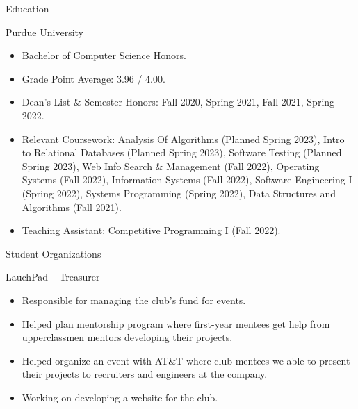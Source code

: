 \documentclass{article}
\newlength{\tabin}
\newlength{\secsep}
\newcommand{\lineunder}{\vspace*{-8pt} \\ \hspace*{-6pt} \hrulefill \\ \vspace*{-15pt}}
\newenvironment{tabbedsection}[1]{
  \begin{list}{}{
      \setlength{\itemsep}{0pt}
      \setlength{\labelsep}{0pt}
      \setlength{\labelwidth}{0pt}
      \setlength{\leftmargin}{\tabin}
      \setlength{\rightmargin}{\tabin}
      \setlength{\listparindent}{0pt}
      \setlength{\parsep}{0pt}
      \setlength{\parskip}{0pt}
      \setlength{\partopsep}{0pt}
      \setlength{\topsep}{#1}
    }
  \item[]
}{\end{list}}
\newenvironment{resume_section}[1]{
  \filbreak
  \vspace{2\secsep}
  \textsc{\large#1}
  \lineunder
  \begin{tabbedsection}{\secsep}
}{\end{tabbedsection}}
\newenvironment{resume_subsection}[2][]{
  \textbf{#2} \hfill {\footnotesize #1} \hspace{2em}
  \begin{tabbedsection}{0.5\secsep}
}{\end{tabbedsection}}
\newenvironment{subitems}{
  \renewcommand{\labelitemi}{-}
  \begin{itemize}
      \setlength{\labelsep}{1em}
}{\end{itemize}}
\begin{document}
\begin{resume_section}{Education}

  \begin{resume_subsection}{Purdue University}

    \begin{subitems}
      \item Bachelor of Computer Science Honors.
      \item Grade Point Average: 3.96 / 4.00.
  	  \item Dean's List \& Semester Honors: Fall 2020, Spring 2021, Fall 2021, Spring 2022.
  	  \item Relevant Coursework: Analysis Of Algorithms (Planned Spring 2023), Intro to Relational Databases (Planned Spring 2023), Software Testing (Planned Spring 2023), Web Info Search \& Management (Fall 2022), Operating Systems (Fall 2022), Information Systems (Fall 2022), Software Engineering I (Spring 2022), Systems Programming (Spring 2022), Data Structures and Algorithms (Fall 2021).
  	  \item Teaching Assistant: Competitive Programming I (Fall 2022).
	\end{subitems}

  \end{resume_subsection}

\end{resume_section}


\begin{resume_section}{Student Organizations}

\begin{resume_subsection}{LauchPad -- Treasurer}

    \begin{subitems}
		\item Responsible for managing the club's fund for events.
		\item Helped plan mentorship program where first-year mentees get help from upperclassmen
		mentors developing their projects.
		\item Helped organize an event with AT\&T where club mentees we able to present their
		projects to recruiters and engineers at the company.
		\item Working on developing a website for the club.
	\end{subitems}

\end{resume_subsection}

\end{resume_section}
\end{document}

